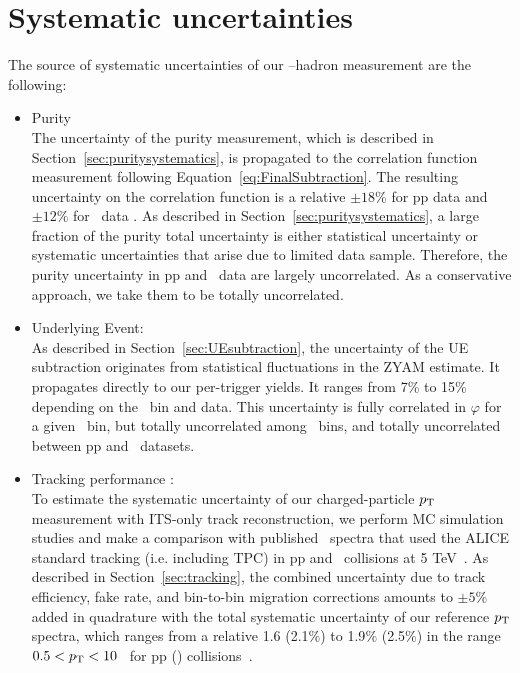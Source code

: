 \section{Systematic uncertainties}
\label{sec:systematics}
The source of systematic uncertainties of our \gammaiso--hadron measurement are the following:
\begin{itemize}
    \item Purity\\
The uncertainty of the purity measurement, which is described in Section~\ref{sec:puritysystematics}, is propagated to the correlation function measurement following Equation~\ref{eq:FinalSubtraction}. The resulting uncertainty on the correlation function is a relative $\pm18\%$ for pp data and  $\pm12\%$ for \pPb~data . As described in Section~\ref{sec:puritysystematics}, a large fraction of the purity total uncertainty is either statistical uncertainty or systematic uncertainties that arise due to limited data sample. Therefore, the purity uncertainty in pp and \pPb~data are largely uncorrelated. As a conservative approach, we take them to be totally uncorrelated.

\item	Underlying Event:\\
As described in Section~\ref{sec:UEsubtraction}, the uncertainty of the UE subtraction originates from statistical fluctuations in the ZYAM estimate. It propagates directly to our per-trigger yields. It ranges from 7\% to 15\% depending on the \zt~bin and data. This uncertainty is fully correlated in $\varphi$ for a given \zt~bin, but totally uncorrelated among \zt~bins, and totally uncorrelated between pp and \pPb~datasets.

\item Tracking performance :\\
To estimate the systematic uncertainty of our charged-particle $p_{\mathrm{T}}$ measurement with ITS-only track reconstruction, we perform MC simulation studies and make a comparison with published \pt~spectra that used the ALICE standard tracking (i.e. including TPC) in pp and \pPb~collisions at 5 TeV~\cite{Acharya:2018qsh}. As described in Section~\ref{sec:tracking}, the combined uncertainty due to track efficiency, fake rate, and bin-to-bin migration corrections amounts to $\pm5\%$ added in quadrature with the total systematic uncertainty of our reference $p_{\mathrm{T}}$ spectra, which ranges from a relative 1.6 (2.1$\%$) to 1.9$\%$ (2.5$\%$) in the range $0.5<p_{\mathrm{T}}<10$ \GeVc~for pp (\pPb) collisions~\cite{Acharya:2018qsh}. 


\end{itemize}
